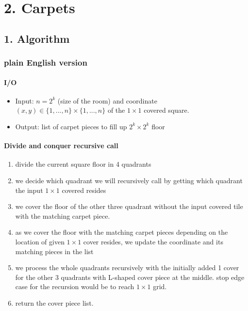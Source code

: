 \documentclass[11pt]{article}
\providecommand{\tightlist}{\setlength{\itemsep}{0pt}\setlength{\parskip}{0pt}}
\providecommand{\set}[1]{\{#1\}}
\begin{document}
\hypertarget{carpets}{%
\section{2. Carpets}\label{carpets}}

\hypertarget{algorithm}{%
\subsection{1. Algorithm}\label{algorithm}}

\hypertarget{plain-english-version}{%
\subsubsection{plain English version}\label{plain-english-version}}

\hypertarget{io}{%
\paragraph{I/O}\label{io}}

\begin{itemize}
\item
  Input: \(n=2^k\) (size of the room) and coordinate
  \((x,y) \in \set{1,...,n} \times \set{1,...,n}\) of the \(1 \times 1\)
  covered square.
\item
  Output: list of carpet pieces to fill up \(2^k \times 2^k\) floor
\end{itemize}

\hypertarget{divide-and-conquer-recursive-call}{%
\paragraph{Divide and conquer recursive
call}\label{divide-and-conquer-recursive-call}}

\begin{enumerate}
\def\labelenumi{\arabic{enumi}.}
\tightlist
\item
  divide the current square floor in 4 quadrants
\item
  we decide which quadrant we will recursively call by getting which
  quadrant the input \(1 \times 1\) covered resides
\item
  we cover the floor of the other three quadrant without the input
  covered tile with the matching carpet piece.
\item
  as we cover the floor with the matching carpet pieces depending on the
  location of given \(1 \times 1\) cover resides, we update the
  coordinate and its matching pieces in the list
\item
  we process the whole quadrants recursively with the initially added 1
  cover for the other 3 quadrants with L-shaped cover piece at the
  middle. stop edge case for the recursion would be to reach
  \(1 \times 1\) grid.
\item
  return the cover piece list.
\end{enumerate}
\end{document}
